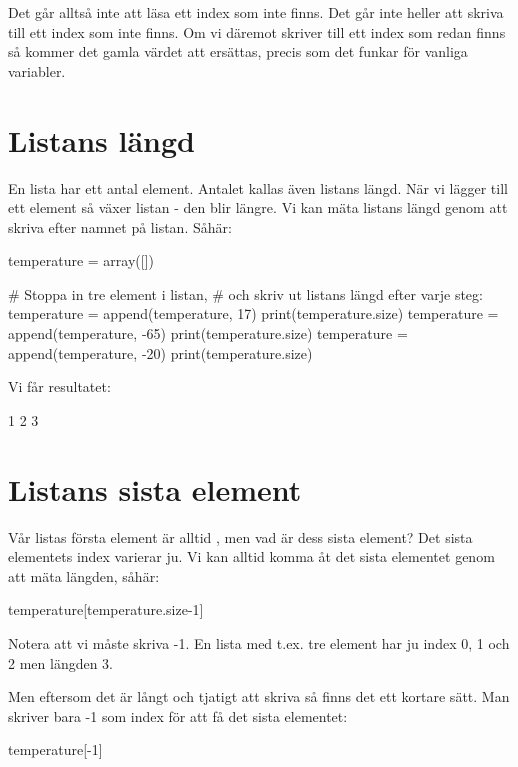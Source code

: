 Det går alltså inte att läsa ett index som inte finns. Det går inte heller att skriva till ett index som inte finns. Om vi däremot skriver till ett index som redan finns så kommer det gamla värdet att ersättas, precis som det funkar för vanliga variabler.

\section{Listans längd}

En lista har ett antal element. Antalet kallas även listans längd. När vi lägger till ett element så växer listan - den blir längre. Vi kan mäta listans längd genom att skriva  efter namnet på listan. Såhär:

\begin{python}[caption={Listans längd},label={}]
temperature = array([])

# Stoppa in tre element i listan,
# och skriv ut listans längd efter varje steg:
temperature = append(temperature, 17)
print(temperature.size)
temperature = append(temperature, -65)
print(temperature.size)
temperature = append(temperature, -20)
print(temperature.size)
\end{python}

Vi får resultatet:

\vspace{10pt}
\begin{python}
1
2
3
\end{python}
\newpage
\section{Listans sista element}

Vår listas första element är alltid , men vad är dess sista element? Det sista elementets index varierar ju. Vi kan alltid komma åt det sista elementet genom att mäta längden, såhär:
\vspace{10pt}
\begin{python}
temperature[temperature.size-1]
\end{python}
Notera att vi måste skriva -1. En lista med t.ex. tre element har ju index 0, 1 och 2 men längden 3.

Men eftersom det är långt och tjatigt att skriva så finns det ett kortare sätt. Man skriver bara -1 som index för att få det sista elementet:
\vspace{10pt}
\begin{python}
temperature[-1]
\end{python}

